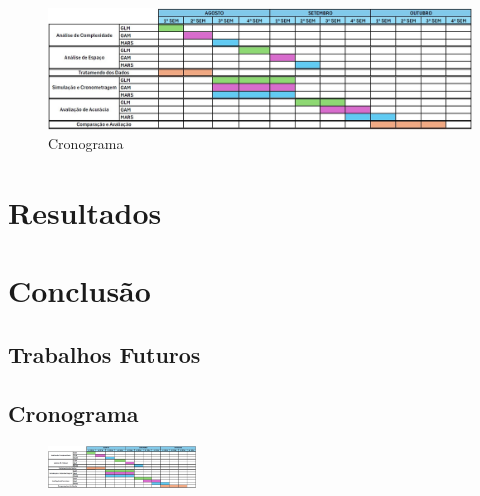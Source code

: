 \documentclass[
    12pt,               %
    openright,          %
    oneside,            %
    a4paper,            %
    english,            %
    brazil              %
    ]{abntex2}
\begin{document}
\begin{figure}[H]
    \centering
    \caption{\label{Cronograma}Cronograma}
    \includegraphics[width=1\textwidth]{../Imgs/Cronograma.jpg}
\end{figure}

 \chapter{Resultados}
 
\chapter{Conclusão}
\section{Trabalhos Futuros}

\postextual



\begin{apendicesenv}

\partapendices

\chapter{\label{AnexoA} Cronograma}
\begin{figure}[h]
    \centering
    \includegraphics[angle=90, width=0.35\textwidth]{../Imgs/Cronograma.jpg}
\end{figure}

\end{apendicesenv}
\end{document}
